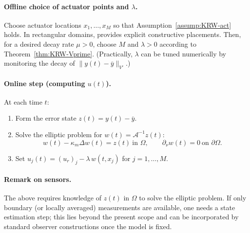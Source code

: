 \documentclass[11pt,a4paper]{article}
\numberwithin{equation}{section}
\theoremstyle{definition}
\newcommand{\1}{\mathbbm{1}}
\begin{document}
\paragraph{Offline choice of actuator points and $\lambda$.}
Choose actuator locations $x_1,\dots,x_M$ so that Assumption~\ref{assump:KRW-act} holds.
In rectangular domains, \cite{KunRodWal24-cocv} provides explicit constructive placements.
Then, for a desired decay rate $\mu>0$, choose $M$ and $\lambda>0$ according to Theorem~\ref{thm:KRW-Vprime}.
(Practically, $\lambda$ can be tuned numerically by monitoring the decay of $\|y(t)-\bar y\|_{V'}$.)

\paragraph{Online step (computing $u(t)$).}
At each time $t$:
\begin{enumerate}
\item Form the error state $z(t)=y(t)-\bar y$.
\item Solve the elliptic problem for $w(t)=\mathcal A^{-1}z(t)$:
\[
w(t) - \kappa_m\Delta w(t) = z(t)\ \text{in }\Omega,\qquad \partial_\nu w(t)=0\ \text{on }\partial\Omega.
\]
\item Set $u_j(t)=(u_r)_j-\lambda\,w(t,x_j)$ for $j=1,\dots,M$.
\end{enumerate}

\paragraph{Remark on sensors.}
The above requires knowledge of $z(t)$ in $\Omega$ to solve the elliptic problem.
If only boundary (or locally averaged) measurements are available, one needs a state estimation step; this lies beyond
the present scope and can be incorporated by standard observer constructions once the model is fixed.
\end{document}
